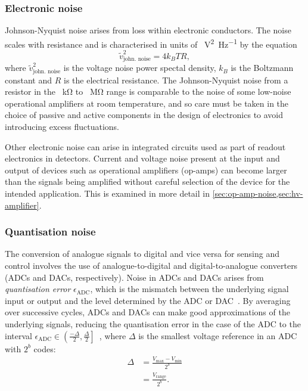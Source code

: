 \subsubsection{\label{sec:johnson-nyquist-noise}Electronic noise}
Johnson-Nyquist noise arises from loss within electronic conductors. The noise scales with resistance and is characterised in units of \SI{}{\volt^2\per\hertz} by the equation
\begin{equation}
  \tilde{v}^2_{\text{john. noise}} = 4 k_B T R,
\end{equation}
where $\tilde{v}^2_{\text{john. noise}}$ is the voltage noise power spectal density, $k_B$ is the Boltzmann constant and $R$ is the electrical resistance. The Johnson-Nyquist noise from a resistor in the \SI{}{\kilo\ohm} to \SI{}{\mega\ohm} range is comparable to the noise of some low-noise operational amplifiers at room temperature, and so care must be taken in the choice of passive and active components in the design of electronics to avoid introducing excess fluctuations.

Other electronic noise can arise in integrated circuits used as part of readout electronics in detectors. Current and voltage noise present at the input and output of devices such as operational amplifiers (op-amps) can become larger than the signals being amplified without careful selection of the device for the intended application. This is examined in more detail in \cref{sec:op-amp-noise,sec:hv-amplifier}.

\subsubsection{\label{sec:quantisation-noise}Quantisation noise}
The conversion of analogue signals to digital and vice versa for sensing and control involves the use of analogue-to-digital and digital-to-analogue converters (\glspl{ADC} and \glspl{DAC}, respectively). Noise in \glspl{ADC} and \glspl{DAC} arises from \emph{quantisation error} $\epsilon_{\text{ADC}}$, which is the mismatch between the underlying signal input or output and the level determined by the \gls{ADC} or \gls{DAC}~\cite{Allen1997}. By averaging over successive cycles, \glspl{ADC} and \glspl{DAC} can make good approximations of the underlying signals, reducing the quantisation error in the case of the \gls{ADC} to the interval $\epsilon_{\text{ADC}} \in \left( \frac{-\Delta}{2}, \frac{\Delta}{2} \right]$~\cite{Allen1997}, where $\Delta$ is the smallest voltage reference in an \gls{ADC} with $2^b$ codes:
\begin{equation}
  \begin{split}
    \Delta &= \frac{V_{\text{max}} - V_{\text{min}}}{2^{b}} \\
           &= \frac{V_{\text{range}}}{2^{b}}.
  \end{split}
\end{equation}

